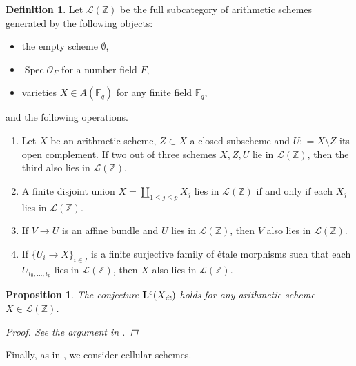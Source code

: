 \documentclass[leqno,12pt]{article}
\theoremstyle{plain}
\newtheorem{proposition}[theorem]{\indent\sc Proposition}
\theoremstyle{definition}
\newtheorem{definition}[theorem]{\indent\sc Definition}
\DeclareMathOperator{\Spec}{Spec}
\newcommand{\FF}{\mathbb{F}}
\newcommand{\ZZ}{\mathbb{Z}}
\newcommand{\dfn}{\mathrel{\mathop:}=}
\newcommand{\et}{\text{\it \'{e}t}}
\begin{document}
\begin{definition}
  Let $\mathcal{L} (\ZZ)$ be the full subcategory of arithmetic schemes
  generated by the following objects:
  \begin{itemize}
  \item the empty scheme $\emptyset$,
  \item $\Spec \mathcal{O}_F$ for a number field $F$,
  \item varieties $X \in A (\FF_q)$ for any finite field $\FF_q$,
  \end{itemize}
  and the following operations.
  \begin{enumerate}
  \item[$\mathcal{L}$1)] Let $X$ be an arithmetic scheme, $Z \subset X$ a closed
    subscheme and $U \dfn X\setminus Z$ its open complement. If two out of three
    schemes $X,Z,U$ lie in $\mathcal{L} (\ZZ)$, then the third also lies in
    $\mathcal{L} (\ZZ)$.

  \item[$\mathcal{L}$2)] A finite disjoint union
    $X = \coprod_{1 \le j \le p} X_j$ lies in $\mathcal{L} (\ZZ)$ if and only if
    each $X_j$ lies in $\mathcal{L} (\ZZ)$.

  \item[$\mathcal{L}$3)] If $V \to U$ is an affine bundle and $U$ lies in
    $\mathcal{L} (\ZZ)$, then $V$ also lies in $\mathcal{L} (\ZZ)$.

  \item[$\mathcal{L}$4)] If $\{ U_i \to X \}_{i \in I}$ is a finite surjective
    family of \'{e}tale morphisms such that each $U_{i_0,\ldots,i_p}$ lies in
    $\mathcal{L} (\ZZ)$, then $X$ also lies in $\mathcal{L} (\ZZ)$.
  \end{enumerate}
\end{definition}

\begin{proposition}
  The conjecture $\mathbf{L}^c (X_\et)$ holds for any arithmetic scheme
  $X \in \mathcal{L} (\ZZ)$.

  \begin{proof}
    See the argument in \cite[Proposition~5.10]{Morin-2014}.
  \end{proof}
\end{proposition}

Finally, as in \cite[\S 5.4]{Morin-2014}, we consider cellular schemes.
\end{document}

